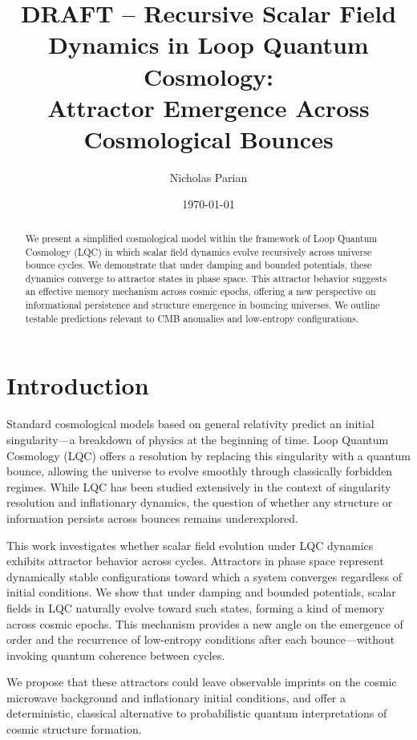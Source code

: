 \documentclass[12pt]{article}
\title{DRAFT -- Recursive Scalar Field Dynamics in Loop Quantum Cosmology: \\
Attractor Emergence Across Cosmological Bounces}
\author{Nicholas Parian}
\affil{Independent Researcher}
\date{\today}
\begin{document}
\maketitle

\begin{abstract}
We present a simplified cosmological model within the framework of Loop Quantum Cosmology (LQC) in which scalar field dynamics evolve recursively across universe bounce cycles. We demonstrate that under damping and bounded potentials, these dynamics converge to attractor states in phase space. This attractor behavior suggests an effective memory mechanism across cosmic epochs, offering a new perspective on informational persistence and structure emergence in bouncing universes. We outline testable predictions relevant to CMB anomalies and low-entropy configurations.
\end{abstract}

\section{Introduction}

Standard cosmological models based on general relativity predict an initial singularity—a breakdown of physics at the beginning of time. Loop Quantum Cosmology (LQC) offers a resolution by replacing this singularity with a quantum bounce\cite{Ashtekar2006,Agullo2017,Bojowald2008}, allowing the universe to evolve smoothly through classically forbidden regimes. While LQC has been studied extensively in the context of singularity resolution and inflationary dynamics, the question of whether any structure or information persists across bounces remains underexplored.

This work investigates whether scalar field evolution under LQC dynamics exhibits attractor behavior across cycles. Attractors in phase space represent dynamically stable configurations toward which a system converges regardless of initial conditions. We show that under damping and bounded potentials, scalar fields in LQC naturally evolve toward such states, forming a kind of memory across cosmic epochs. This mechanism provides a new angle on the emergence of order and the recurrence of low-entropy conditions after each bounce—without invoking quantum coherence between cycles.

We propose that these attractors could leave observable imprints on the cosmic microwave background and inflationary initial conditions, and offer a deterministic, classical alternative to probabilistic quantum interpretations of cosmic structure formation.
\end{document}

